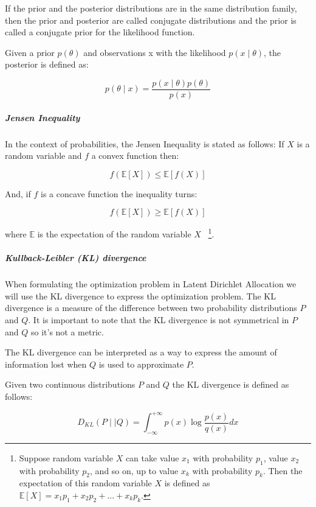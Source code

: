 \documentclass[12pt]{report}
\begin{document}
If the prior and the posterior distributions are in the same distribution
family, then the prior and posterior are called conjugate distributions and the
prior is called a conjugate prior for the likelihood function.

Given a prior $p(\theta)$ and observations x with the likelihood 
$p(x \mid \theta)$, the posterior is defined as:

\begin{equation}
p(\theta \mid x) = \frac{p(x \mid \theta) p(\theta)}{p(x)}
\end{equation}


\subparagraph{Jensen Inequality}

In the context of probabilities, the Jensen Inequality is stated as
follows: If $X$ is a random variable and $f$ a
convex function then:

\begin{equation}
f(\mathbb{E}[X]) \leq \mathbb{E}[f(X)]
\end{equation}

And, if $f$ is a concave function the inequality turns:

\begin{equation}
f(\mathbb{E}[X]) \geq \mathbb{E}[f(X)]
\end{equation}

where $\mathbb{E}$ is the expectation of the random variable $X$
~\footnote{Suppose random variable $X$ can take value $x_{1}$ with 
probability $p_{1}$, value $x_{2}$ with probability $p_{2}$, 
and so on, up to value $x_{k}$ with probability $p_{k}$. 
Then the expectation of this random variable $X$ is defined as
$\mathbb{E}[X] = x_{1}p_{1} + x_{2}p_{2} + ... + x_{k}p_{k}$.}.

\subparagraph{Kullback-Leibler (KL) divergence}

When formulating the optimization problem in Latent Dirichlet
Allocation we will use the KL divergence to express the optimization
problem. The KL divergence is a measure of the difference between two
probability distributions $P$ and $Q$. It is important to note that
the KL divergence is not symmetrical in $P$ and $Q$ so it's not a
metric.

The KL divergence can be interpreted as a way to express the amount of 
information lost when $Q$ is used to approximate $P$.

Given two continuous distributions $P$ and $Q$ the KL divergence is
defined as follows:

\begin{equation}
D_{KL}(P \mid \mid Q) = \int_{-\infty}^{+\infty} p(x) \log\frac{p(x)}{q(x)}dx
\end{equation}
\end{document}
